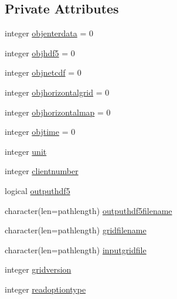 \subsection*{Private Attributes}
\begin{DoxyCompactItemize}
\item 
integer \mbox{\hyperlink{structmoduleihradarformat_1_1t__ihradarformat_a16e7ab342bcf4eb5357a5bde69a2cea1}{objenterdata}} = 0
\item 
integer \mbox{\hyperlink{structmoduleihradarformat_1_1t__ihradarformat_a06cf45d65b48f694f3cbc6b8c3248e39}{objhdf5}} = 0
\item 
integer \mbox{\hyperlink{structmoduleihradarformat_1_1t__ihradarformat_a74513c0af1cad075eb2a6b2be32aeb28}{objnetcdf}} = 0
\item 
integer \mbox{\hyperlink{structmoduleihradarformat_1_1t__ihradarformat_adbb1750c04f1311b3c16a1d37ed9fd81}{objhorizontalgrid}} = 0
\item 
integer \mbox{\hyperlink{structmoduleihradarformat_1_1t__ihradarformat_ae3f3a9764dd45fc3a5e05b13c4af9d9e}{objhorizontalmap}} = 0
\item 
integer \mbox{\hyperlink{structmoduleihradarformat_1_1t__ihradarformat_a7d3b6979d087cea8d6ededfb1d1efff2}{objtime}} = 0
\item 
integer \mbox{\hyperlink{structmoduleihradarformat_1_1t__ihradarformat_ad0c1d71a7c575b239b96e6b770583f67}{unit}}
\item 
integer \mbox{\hyperlink{structmoduleihradarformat_1_1t__ihradarformat_a4a28c48e2351e66fe3c771bab1871a70}{clientnumber}}
\item 
logical \mbox{\hyperlink{structmoduleihradarformat_1_1t__ihradarformat_af5657ddbb8515496ccb9be374b7e83f3}{outputhdf5}}
\item 
character(len=pathlength) \mbox{\hyperlink{structmoduleihradarformat_1_1t__ihradarformat_a4c16513d31f002ad01f7c6347ebffbf6}{outputhdf5filename}}
\item 
character(len=pathlength) \mbox{\hyperlink{structmoduleihradarformat_1_1t__ihradarformat_ad1ce9fd7b8e12db59662b94e26d4d1ca}{gridfilename}}
\item 
character(len=pathlength) \mbox{\hyperlink{structmoduleihradarformat_1_1t__ihradarformat_a868731a96af5d3f713838b69766fc964}{inputgridfile}}
\item 
integer \mbox{\hyperlink{structmoduleihradarformat_1_1t__ihradarformat_a241610a4fab29bcff862f29bb5000f9c}{gridversion}}
\item 
integer \mbox{\hyperlink{structmoduleihradarformat_1_1t__ihradarformat_a9cab0b841bc37c8ebdccda84563752f0}{readoptiontype}}

\end{DoxyCompactItemize}
